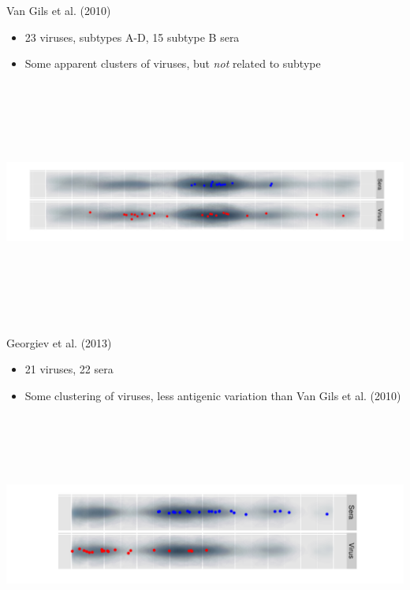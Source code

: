 \documentclass[final]{beamer}
\begin{document}
\begin{frame}{}
\begin{textblock}{40}
\begin{block}{Van Gils et al. (2010)}
\begin{itemize}
\item{23 viruses, subtypes A-D, 15 subtype B sera}
\item{Some apparent clusters of viruses, but \textit{not} related to subtype}
\end{itemize}
\begin{center}
\includegraphics[height=8cm]{vangilsmap.pdf}
\end{center}
\end{block}

\begin{block}{Georgiev et al. (2013)}
\begin{itemize}
\item{21 viruses, 22 sera}
\item{Some clustering of viruses, less antigenic variation than Van Gils et al. (2010)}
\end{itemize}
\begin{center}
\includegraphics[height=8cm]{georgievmap.pdf}
\end{center}
\end{block}


\end{textblock}
\end{frame}
\end{document}
